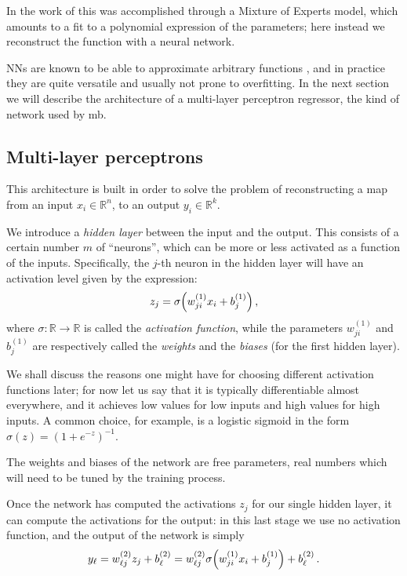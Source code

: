 \documentclass[main.tex]{subfiles}
\begin{document}
In the work of \textcite[]{schmidtMachineLearningGravitational2020} this was accomplished through a Mixture of Experts model, which amounts to a fit to a polynomial expression of the parameters; here instead we reconstruct the function with a neural network. 

\acsp{NN} are known to be able to approximate arbitrary functions \cite[]{nielsenNeuralNetworksDeep2015}, and in practice they are quite versatile and usually not prone to overfitting. 
In the next section we will describe the architecture of a multi-layer perceptron regressor, the kind of network used by \acs{mb}.

\subsection{Multi-layer perceptrons}

This architecture is built in order to solve the problem of reconstructing a map from an input \(x_i \in \mathbb{R}^{n}\), to an output \(y_i \in \mathbb{R}^{k}\).

We introduce a \emph{hidden layer} between the input and the output. 
This consists of a certain number \(m\) of ``neurons'', which can be more or less activated as a function of the inputs.
Specifically, the \(j\)-th neuron in the hidden layer will have an activation level given by the expression: 
%
\begin{align} \label{eq:nn-one-layer}
z_j = \sigma \qty( w^{(1)}_{ji} x_i + b^{(1)}_j)
\,,
\end{align}
%
where \(\sigma \colon \mathbb{R} \to \mathbb{R}\) is called the \emph{activation function}, while the parameters \(w^{(1)}_{ji}\) and \(b^{(1)}_j\) are respectively called the \emph{weights} and the \emph{biases} (for the first hidden layer). 

We shall discuss the reasons one might have for choosing different activation functions later; for now let us say that it is typically differentiable almost everywhere, and it achieves low values for low inputs and high values for high inputs.
A common choice, for example, is a logistic sigmoid in the form \(\sigma (z) = (1 + e^{-z})^{-1}\). 

The weights and biases of the network are free parameters, real numbers which will need to be tuned by the training process. 

Once the network has computed the activations \(z_j\) for our single hidden layer, it can compute the activations for the output: in this last stage we use no activation function, and the output of the network is simply 
%
\begin{align}
y_\ell = w^{(2)}_{\ell j} z_j + b^{(2)}_{\ell} 
= w^{(2)}_{\ell j} \sigma \qty( w^{(1)}_{ji} x_i + b^{(1)}_j ) + b^{(2)}_{\ell}
\,.
\end{align}
\end{document}
